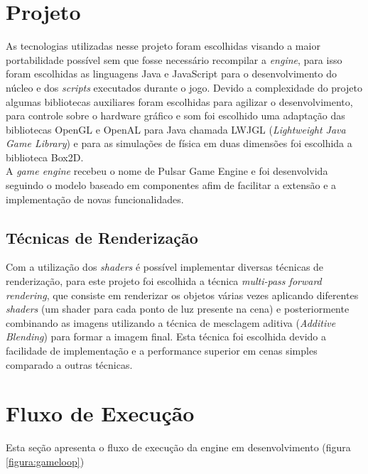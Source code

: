 \documentclass[12pt,	openright, twoside,	a4paper, english, french, spanish, brazil]{abntex2}
\begin{document}
%
%

\section{Projeto}

As tecnologias utilizadas nesse projeto foram escolhidas visando a maior portabilidade possível sem que fosse necessário recompilar a \textit{engine}, para isso foram escolhidas as linguagens Java e JavaScript para o desenvolvimento do núcleo e dos \textit{scripts} executados durante o jogo. Devido a complexidade do projeto algumas bibliotecas auxiliares foram escolhidas para agilizar o desenvolvimento, para controle sobre o hardware gráfico e som foi escolhido uma adaptação das bibliotecas OpenGL e OpenAL para Java chamada LWJGL (\textit{Lightweight Java Game Library}) e para as simulações de física em duas dimensões foi escolhida a biblioteca Box2D. \\
A \textit{game engine} recebeu o nome de Pulsar Game Engine e foi desenvolvida seguindo o modelo baseado em componentes afim de facilitar a extensão e a implementação de novas funcionalidades. 

\subsection{Técnicas de Renderização}
Com a utilização dos \textit{shaders} é possível implementar diversas técnicas de renderização, para este projeto foi escolhida a técnica \textit{multi-pass forward rendering}, que consiste em renderizar os objetos várias vezes aplicando diferentes \textit{shaders} (um shader para cada ponto de luz presente na cena) e posteriormente combinando as imagens utilizando a técnica de mesclagem aditiva (\textit{Additive Blending}) para formar a imagem final. Esta técnica foi escolhida devido a facilidade de implementação e a performance superior em cenas simples comparado a outras técnicas.

%
%

\section{Fluxo de Execução}
Esta seção apresenta o fluxo de execução da engine em desenvolvimento (figura \ref{figura:gameloop})
\end{document}
